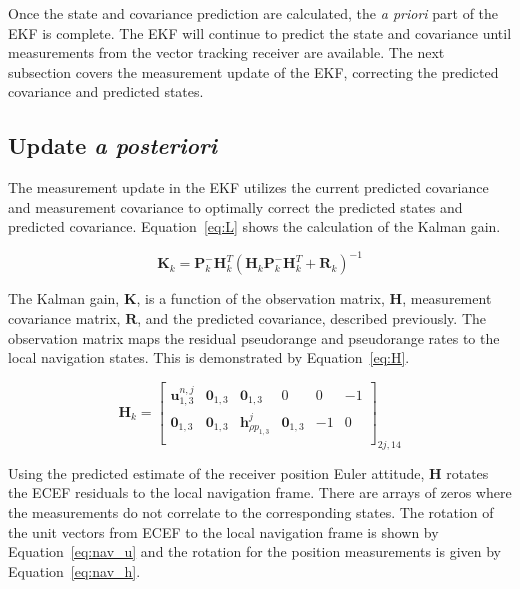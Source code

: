 Once the state and covariance prediction are calculated, the \textit{a priori} part of the EKF is complete. The EKF will continue to predict the state and covariance until measurements from the vector tracking receiver are available. The next subsection covers the measurement update of the EKF, correcting the predicted covariance and predicted states.

\subsection{\textbf{Update \textit{a posteriori}}}
The measurement update in the EKF utilizes the current predicted covariance and measurement covariance to optimally correct the predicted states and predicted covariance. Equation~\ref{eq:L} shows the calculation of the Kalman gain.

\begin{equation}\label{eq:L}
    \mathbf{K}_k = \mathbf{P}^-_k \mathbf{H}^T_k{\left(\mathbf{H}_k\mathbf{P}^-_k\mathbf{H}^T_k + \mathbf{R}_k\right)}^{-1}
\end{equation}

The Kalman gain, \(\mathbf{K}\), is a function of the observation matrix, \(\mathbf{H}\), measurement covariance matrix, \(\mathbf{R}\), and the predicted covariance, described previously. The observation matrix maps the residual pseudorange and pseudorange rates to the local navigation states. This is demonstrated by Equation~\ref{eq:H}.

\begin{equation}\label{eq:H}
    \mathbf{H}_k = \begin{bmatrix}
        \mathbf{u}^{n,j}_{1,3} & \mathbf{0}_{1,3} & \mathbf{0}_{1,3}            & 0                & 0  & -1 \\
        \mathbf{0}_{1,3}       & \mathbf{0}_{1,3} & \mathbf{h}^j_{\rho p_{1,3}} & \mathbf{0}_{1,3} & -1 & 0  \\
    \end{bmatrix}_{2j,14}
\end{equation}

Using the predicted estimate of the receiver position Euler attitude, \(\mathbf{H}\) rotates the ECEF residuals to the local navigation frame. There are arrays of zeros where the measurements do not correlate to the corresponding states. The rotation of the unit vectors from ECEF to the local navigation frame is shown by Equation~\ref{eq:nav_u} and the rotation for the position measurements is given by Equation~\ref{eq:nav_h}.


